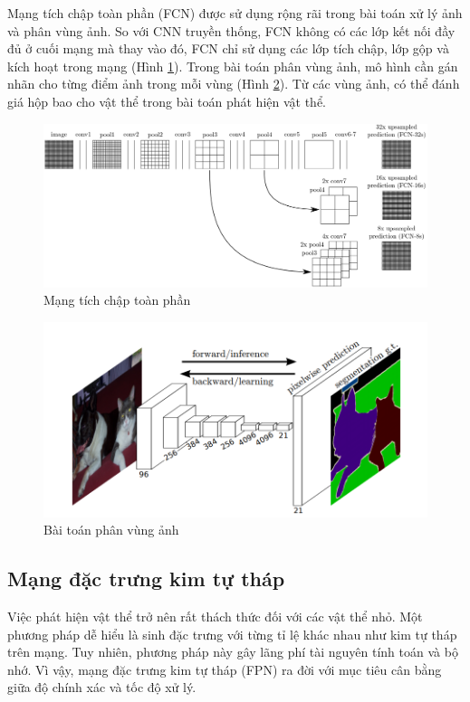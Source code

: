 Mạng tích chập toàn phần (FCN) được sử dụng rộng rãi trong bài toán xử lý ảnh và phân vùng ảnh. So với CNN truyền thống, FCN không có các lớp kết nối đầy đủ ở cuối mạng mà thay vào đó, FCN chỉ sử dụng các lớp tích chập, lớp gộp và kích hoạt trong mạng (Hình \ref{fig:fcn1}). Trong bài toán phân vùng ảnh, mô hình cần gán nhãn cho từng điểm ảnh trong mỗi vùng (Hình \ref{fig:fcn2}). Từ các vùng ảnh, có thể đánh giá hộp bao cho vật thể trong bài toán phát hiện vật thể.

\begin{figure}[h]
	\centering
	\includegraphics[width=0.99\linewidth]{images/fcn1}
	\caption{Mạng tích chập toàn phần}
	\label{fig:fcn1}
\end{figure}

\begin{figure}[h]
	\centering
	\includegraphics[width=0.9\linewidth]{images/fcn2}
	\caption{Bài toán phân vùng ảnh}
	\label{fig:fcn2}
\end{figure}


\subsection{Mạng đặc trưng kim tự tháp}

Việc phát hiện vật thể trở nên rất thách thức đối với các vật thể nhỏ. Một phương pháp dễ hiểu là sinh đặc trưng với từng tỉ lệ khác nhau như kim tự tháp trên mạng. Tuy nhiên, phương pháp này gây lãng phí tài nguyên tính toán và bộ nhớ. Vì vậy, mạng đặc trưng kim tự tháp (FPN) ra đời với mục tiêu cân bằng giữa độ chính xác và tốc độ xử lý.

